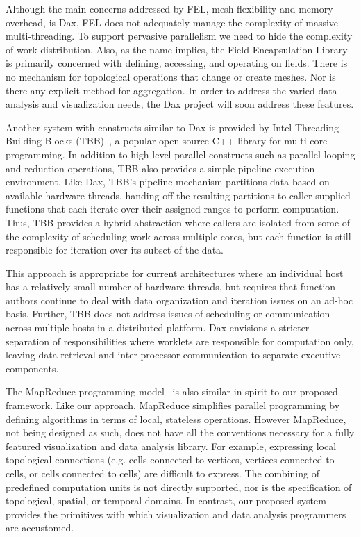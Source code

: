 \documentclass{vgtc}                          %
\newcommand*{\lcite}[1]{~\cite{#1}}
\begin{document}
Although the main concerns addressed by FEL, mesh flexibility and memory
overhead, is Dax, FEL does not adequately manage
the complexity of massive multi-threading.  To support pervasive parallelism
we need to hide the complexity of work distribution.  Also, as the name
implies, the Field Encapsulation Library is primarily concerned with
defining, accessing, and operating on fields.  There is no mechanism for
topological operations that change or create meshes.  Nor is there any
explicit method for aggregation.  In order to address the varied data
analysis and visualization needs, the Dax project will soon address these
features. 

Another system with constructs similar to Dax
is provided by Intel Threading Building Blocks (TBB)\lcite{TBB}, a
popular open-source C++ library for multi-core programming.  In addition to
high-level parallel constructs such as parallel looping and reduction
operations, TBB also provides a simple pipeline execution environment.
Like Dax, TBB's pipeline mechanism
partitions data based on available hardware threads, handing-off the
resulting partitions to caller-supplied functions that each iterate over
their assigned ranges to perform computation.  Thus, TBB provides a hybrid
abstraction where callers are isolated from some of the complexity of
scheduling work across multiple cores, but each function is still
responsible for iteration over its subset of the data.

This approach is appropriate for current architectures where an individual
host has a relatively small number of hardware threads, but requires that
function authors continue to deal with data organization and iteration
issues on an ad-hoc basis.  Further, TBB does not address issues of
scheduling or communication across multiple hosts in a distributed
platform.  Dax envisions a stricter separation of
responsibilities where worklets are responsible for computation only,
leaving data retrieval and inter-processor communication to separate
executive components.

The MapReduce programming model\lcite{MapReduce} is also similar in spirit
to our proposed framework.  Like our approach, MapReduce simplifies
parallel programming by defining algorithms in terms of local, stateless
operations.  However MapReduce, not being designed as such, does not have
all the conventions necessary for a fully featured visualization and data
analysis library.  For example, expressing local topological connections
(e.g. cells connected to vertices, vertices connected to cells, or cells
connected to cells) are difficult to express.  The combining of predefined
computation units is not directly supported, nor is the specification of
topological, spatial, or temporal domains.  In contrast, our proposed
system provides the primitives with which visualization and data analysis
programmers are accustomed.
\end{document}
